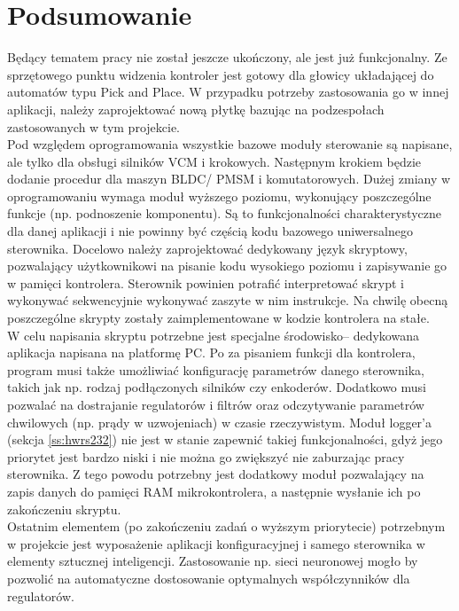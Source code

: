 \section*{Podsumowanie}

Będący tematem pracy \paperTitleSmallPl{} nie został jeszcze ukończony, ale jest już funkcjonalny. Ze sprzętowego punktu widzenia kontroler jest gotowy dla głowicy układającej do automatów typu Pick and Place. W przypadku potrzeby zastosowania go w innej aplikacji, należy zaprojektować nową płytkę bazując na podzespołach zastosowanych w tym projekcie. \\

Pod względem oprogramowania wszystkie bazowe moduły sterowanie są napisane, ale tylko dla obsługi silników VCM i krokowych. Następnym krokiem będzie dodanie procedur dla maszyn BLDC/ PMSM i komutatorowych. Dużej zmiany w oprogramowaniu wymaga moduł wyższego poziomu, wykonujący poszczególne funkcje (np. podnoszenie komponentu). Są to funkcjonalności charakterystyczne dla danej aplikacji i nie powinny być częścią kodu bazowego uniwersalnego sterownika. Docelowo należy zaprojektować dedykowany język skryptowy, pozwalający użytkownikowi na pisanie kodu wysokiego poziomu i zapisywanie go w pamięci kontrolera. Sterownik powinien potrafić interpretować skrypt i wykonywać sekwencyjnie wykonywać zaszyte w nim instrukcje. Na chwilę obecną poszczególne skrypty zostały zaimplementowane w kodzie kontrolera na stałe. \\

W celu napisania skryptu potrzebne jest specjalne środowisko-- dedykowana aplikacja napisana na platformę PC. Po za pisaniem funkcji dla kontrolera, program musi także umożliwiać konfigurację parametrów danego sterownika, takich jak np. rodzaj podłączonych silników czy enkoderów. Dodatkowo musi pozwalać na dostrajanie regulatorów i filtrów oraz odczytywanie parametrów chwilowych (np. prądy w uzwojeniach) w czasie rzeczywistym. Moduł logger'a (sekcja \ref{ss:hwrs232}) nie jest w stanie zapewnić takiej funkcjonalności, gdyż jego priorytet jest bardzo niski i nie można go zwiększyć nie zaburzając pracy sterownika. Z tego powodu potrzebny jest dodatkowy moduł pozwalający na zapis danych do pamięci RAM mikrokontrolera, a następnie wysłanie ich po zakończeniu skryptu. \\

Ostatnim elementem (po zakończeniu zadań o wyższym priorytecie) potrzebnym w projekcie jest wyposażenie aplikacji konfiguracyjnej i samego sterownika w elementy sztucznej inteligencji. Zastosowanie np. sieci neuronowej mogło by pozwolić na automatyczne dostosowanie optymalnych współczynników dla regulatorów.


\clearpage





